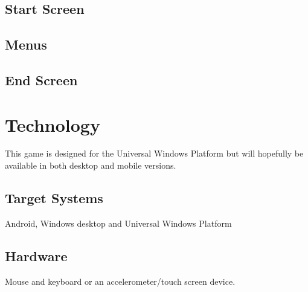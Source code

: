 \documentclass[a4paper]{scrreprt}
\begin{document}
\section{Start Screen}

\section{Menus}

\section{End Screen}



\chapter{Technology}
This game is designed for the Universal Windows Platform but will hopefully be available in both desktop and mobile versions.

\section{Target Systems}
Android, Windows desktop and Universal Windows Platform

\section{Hardware}
Mouse and keyboard or an accelerometer/touch screen device.
\end{document}
